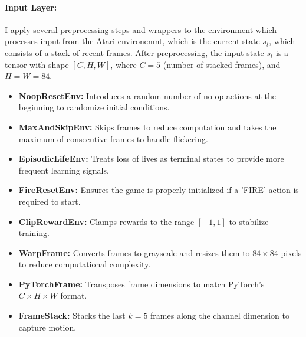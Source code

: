 \documentclass[
12pt, %
oneside, %
english, %
onehalfspacing, %
nolistspacing, %
liststotoc, %
headsepline, %
]{ProposalAndThesis} %
\begin{document}
\paragraph{Input Layer:}
I apply several preprocessing steps and wrappers to the environment which processes input from the Atari environemnt, which is the current state \( s_t \), which consists of a stack of recent frames. After preprocessing, the input state \( s_t \) is a tensor with shape \( [C, H, W] \), where \( C = 5 \) (number of stacked frames), and \( H = W = 84 \).
\begin{itemize}
    \item \textbf{NoopResetEnv:} Introduces a random number of no-op actions at the beginning to randomize initial conditions.
    \item \textbf{MaxAndSkipEnv:} Skips frames to reduce computation and takes the maximum of consecutive frames to handle flickering.
    \item \textbf{EpisodicLifeEnv:} Treats loss of lives as terminal states to provide more frequent learning signals.
    \item \textbf{FireResetEnv:} Ensures the game is properly initialized if a 'FIRE' action is required to start.
    \item \textbf{ClipRewardEnv:} Clamps rewards to the range \([-1, 1]\) to stabilize training.
    \item \textbf{WarpFrame:} Converts frames to grayscale and resizes them to \(84 \times 84\) pixels to reduce computational complexity.
    \item \textbf{PyTorchFrame:} Transposes frame dimensions to match PyTorch's \( C \times H \times W \) format.
    \item \textbf{FrameStack:} Stacks the last \( k = 5 \) frames along the channel dimension to capture motion.
\end{itemize}
\end{document}
